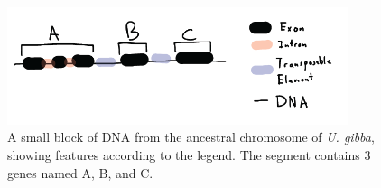 \documentclass[]{article}
\begin{document}
\begin{enumerate}
\begin{figure}[h]
  \begin{center}
   \includegraphics[width=100mm]{images/minute_gene_block.png}
\caption{A small block of DNA from the ancestral chromosome of \emph{U. gibba}, showing features according to the legend.  The segment contains 3 genes named A, B, and C.}
\label{minute}
  \end{center}
\end{figure}

\end{enumerate}
\end{document}
